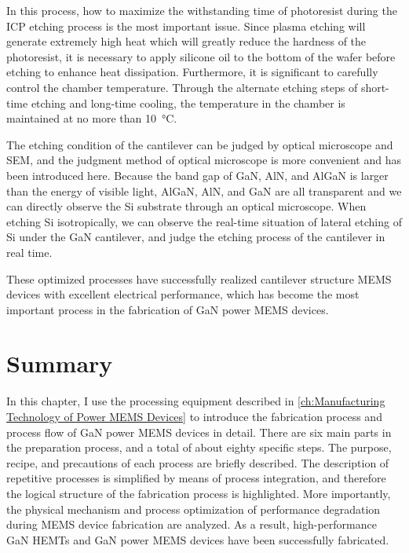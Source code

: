 In  this process, how to maximize the withstanding time of photoresist during the  ICP etching process is the most important issue. Since plasma etching will generate extremely high heat which will greatly reduce the hardness of the photoresist, it is necessary to apply silicone oil to the bottom of the wafer  before etching to enhance heat dissipation. Furthermore, it is significant to carefully control the chamber temperature. Through the alternate etching steps of short-time etching and long-time cooling, the temperature in the chamber is maintained at no more than \SI{10}{\degreeCelsius}. 

The etching condition of the cantilever  can be judged by optical microscope and  SEM, and the judgment method of optical microscope is more convenient and has been introduced here. Because the band gap of GaN, AlN, and AlGaN is larger than the energy of visible light, AlGaN, AlN, and GaN are all transparent and we can directly observe the Si substrate  through an optical microscope. When etching Si isotropically, we can observe the real-time situation of lateral etching of Si under the GaN cantilever, and judge the etching process of the cantilever  in real time.

These optimized processes have successfully realized cantilever structure MEMS devices with excellent electrical performance, which has become the most important process in the fabrication of GaN power MEMS devices.

\section{Summary}

In this chapter, I use the processing equipment described in \autoref{ch:Manufacturing Technology of Power MEMS Devices} to introduce the fabrication process and process flow of GaN power MEMS  devices in detail. There are six main parts in the preparation process, and a total of about eighty specific steps. The purpose, recipe, and precautions of each process are briefly described. The description of repetitive processes is simplified by means of process integration, and therefore the logical structure of the fabrication process is highlighted. More importantly, the physical mechanism and process optimization of performance degradation during MEMS device fabrication are analyzed. As a result, high-performance GaN HEMTs and GaN power MEMS devices have been successfully  fabricated.



